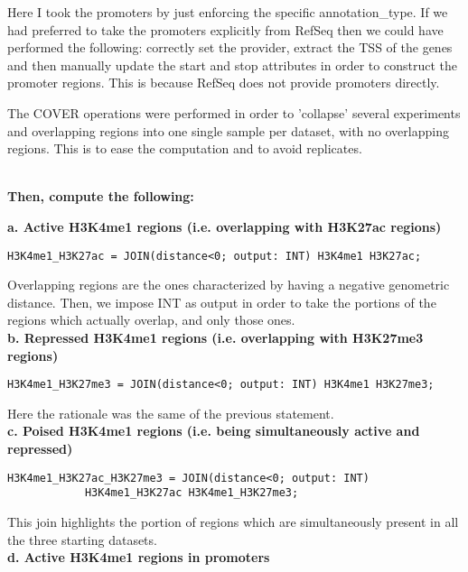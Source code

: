 \documentclass[12pt, a4paper]{article}
\begin{document}
Here I took the promoters by just enforcing the specific annotation\_type. If we had preferred to take the promoters explicitly from RefSeq then we could have performed the following: correctly set the provider, extract the TSS of the genes and then manually update the start and stop attributes in order to construct the promoter regions. This is because RefSeq does not provide promoters directly.

The COVER operations were performed in order to 'collapse' several experiments and overlapping regions into one single sample per dataset, with no overlapping regions. This is to ease the computation and to avoid replicates.

\textbf{\\Then, compute the following:}

\textbf{a. Active H3K4me1 regions (i.e. overlapping with H3K27ac regions)}

\begin{verbatim}
H3K4me1_H3K27ac = JOIN(distance<0; output: INT) H3K4me1 H3K27ac;
\end{verbatim}

Overlapping regions are the ones characterized by having a negative genometric distance. Then, we impose INT as output in order to take the portions of the regions which actually overlap, and only those ones.\\

\textbf{b. Repressed H3K4me1 regions (i.e. overlapping with H3K27me3 regions)}

\begin{verbatim}
H3K4me1_H3K27me3 = JOIN(distance<0; output: INT) H3K4me1 H3K27me3;
\end{verbatim} 

Here the rationale was the same of the previous statement.\\

\textbf{c. Poised H3K4me1 regions (i.e. being simultaneously active and repressed)}

\begin{verbatim}
H3K4me1_H3K27ac_H3K27me3 = JOIN(distance<0; output: INT)
            H3K4me1_H3K27ac H3K4me1_H3K27me3;
\end{verbatim} 

This join highlights the portion of regions which are simultaneously present in all the three starting datasets.\\

\textbf{d. Active H3K4me1 regions in promoters}
\end{document}
